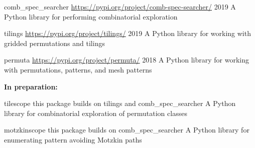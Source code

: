


\begin{cvhonors}



\cvhonor
  {comb\_spec\_searcher} %
  {\url{https://pypi.org/project/comb-spec-searcher/}} %
  {2019} %
  {A Python library for performing combinatorial exploration} %



\cvhonor
  {tilings} %
  {\url{https://pypi.org/project/tilings/}} %
  {2019} %
  {A Python library for working with gridded permutations and tilings} %



\cvhonor
  {permuta} %
  {\url{https://pypi.org/project/permuta/}} %
  {2018} %
  {A Python library for working with permutations, patterns, and mesh patterns} %

\begin{flushleft}
  \textbf{In preparation:}
\end{flushleft}


\cvhonor
  {tilescope} %
  {this package builds on tilings and comb\_spec\_searcher} %
  {} %
  {A Python library for combinatorial exploration of permutation classes} %



\cvhonor
  {motzkinscope} %
  {this package builds on comb\_spec\_searcher} %
  {} %
  {A Python library for enumerating pattern avoiding Motzkin paths} %


\end{cvhonors}
